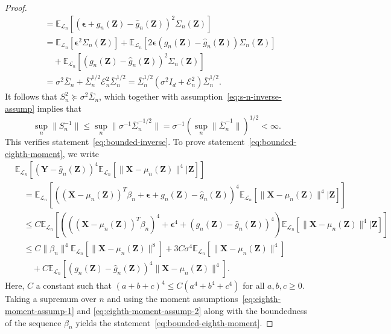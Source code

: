 \documentclass[12pt]{article}
\theoremstyle{definition}
\theoremstyle{remark}
\newcommand{\prx}{\bm X}
\newcommand{\prz}{\bm Z}
\newcommand{\pry}{{\bm Y}}
\newcommand{\peps}{\bm \epsilon}
\begin{document}
\begin{proof}
\begin{equation}
\begin{split}
		&=\mathbb E_{\mathcal L_n}[( \peps + g_n(\prz)-\widehat g_n(\prz))^2 \Sigma_n(\prz)] \\
		& = \mathbb E_{\mathcal L_n}[\peps ^2 \Sigma_n(\prz)] + \mathbb E_{\mathcal L_n}[2\peps(g_n(\prz)-\widehat g_n(\prz))\Sigma_n(\prz)]  \\
		&\quad + \mathbb E_{\mathcal L_n}[(g_n(\prz)-\widehat g_n(\prz))^2\Sigma_n(\prz)] \\
		&= \sigma^2 \overline \Sigma_n + \overline \Sigma_n^{1/2}\mathcal E^2_n \overline \Sigma_n^{1/2}  = \overline \Sigma_n^{1/2}(\sigma^2 I_d + \mathcal E^2_n) \overline \Sigma_n^{1/2}.
		\label{eq:s-n-2-prime}
	\end{split}
\end{equation}
It follows that $S_n^2 \succcurlyeq \sigma^2 \overline \Sigma_n$, which together with assumption~\eqref{eq:s-n-inverse-assump} implies that
\begin{equation}
\sup_n \|S_n^{-1}\| \leq \sup_n \|\sigma^{-1}\overline \Sigma_n^{-1/2}\| = \sigma^{-1}\left(\sup_n \|\overline \Sigma_n^{-1}\|\right)^{1/2} < \infty.
\end{equation}
This verifies statement~\eqref{eq:bounded-inverse}.	To prove statement~\eqref{eq:bounded-eighth-moment}, we write
	\begin{equation*}
		\begin{split}
			&\mathbb E_{\mathcal L_n}\left[ (\pry - \widehat g_n(\prz))^{4}\mathbb E_{\mathcal L_n}[\|\prx - \mu_n(\prz)\|^{4}|\prz]\right] \\
			&\quad= \mathbb E_{\mathcal L_n}\left[ ((\prx - \mu_n(\prz))^T \beta_n + \peps + g_n(\prz)-\widehat g_n(\prz))^4\mathbb E_{\mathcal L_n}[\|\prx - \mu_n(\prz)\|^{4}|\prz]\right] \\
			&\quad\leq C\mathbb E_{\mathcal L_n}\left[(((\prx - \mu_n(\prz))^T \beta_n)^4 + \peps^4 + (g_n(\prz)-\widehat g_n(\prz))^4) \mathbb E_{\mathcal L_n}[\|\prx - \mu_n(\prz)\|^{4}|\prz]\right] \\
			&\quad\leq C\|\beta_n\|^4\mathbb E_{\mathcal L_n}[\|\prx - \mu_n(\prz)\|^{8}] + 3C\sigma^4\mathbb E_{\mathcal L_n}[\|\prx - \mu_n(\prz)\|^{4}] \\
			&\quad \quad + C \mathbb E_{\mathcal L_n}\left[(g_n(\prz) - \widehat g_n(\prz))^{4} \|\prx - \mu_n(\prz)\|^{4}\right].
		\end{split}
	\end{equation*}
	Here, $C$ a constant such that $(a + b + c)^4 \leq C(a^4 + b^4 + c^4)$ for all $a,b,c \geq 0$. Taking a supremum over $n$ and using the moment assumptions~\eqref{eq:eighth-moment-assump-1} and \eqref{eq:eighth-moment-assump-2} along with the boundedness of the sequence $\beta_n$ yields the statement~\eqref{eq:bounded-eighth-moment}. 
	

\end{proof}
\end{document}
